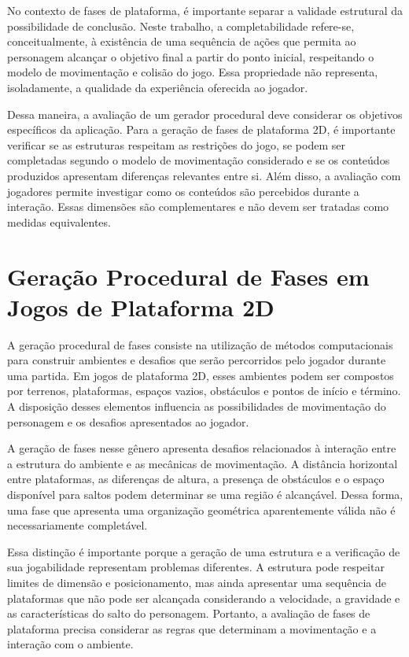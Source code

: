 No contexto de fases de plataforma, é importante
separar a validade estrutural da possibilidade de
conclusão. Neste trabalho, a completabilidade refere-se,
conceitualmente, à existência de uma sequência de ações
que permita ao personagem alcançar o objetivo final
a partir do ponto inicial, respeitando o modelo de
movimentação e colisão do jogo. Essa propriedade não
representa, isoladamente, a qualidade da experiência
oferecida ao jogador.

Dessa maneira, a avaliação de um gerador procedural
deve considerar os objetivos específicos da aplicação.
Para a geração de fases de plataforma 2D, é importante
verificar se as estruturas respeitam as restrições
do jogo, se podem ser completadas
segundo o modelo de movimentação considerado e se
os conteúdos produzidos apresentam diferenças
relevantes entre si. Além disso, a avaliação com jogadores
permite investigar como os conteúdos são percebidos
durante a interação. Essas dimensões são complementares
e não devem ser tratadas como medidas equivalentes.

\section{Geração Procedural de Fases em Jogos de Plataforma 2D}
\label{sec:geracao-fases}

A geração procedural de fases consiste na utilização de
métodos computacionais para construir ambientes e desafios
que serão percorridos pelo jogador durante uma partida.
Em jogos de plataforma 2D, esses ambientes podem ser
compostos por terrenos, plataformas, espaços vazios,
obstáculos e pontos de início e término. A disposição
desses elementos influencia as possibilidades de
movimentação do personagem e os desafios apresentados
ao jogador.

A geração de fases nesse gênero apresenta desafios
relacionados à interação entre a estrutura do ambiente
e as mecânicas de movimentação. A distância horizontal
entre plataformas, as diferenças de altura, a presença
de obstáculos e o espaço disponível para saltos podem
determinar se uma região é alcançável. Dessa forma,
uma fase que apresenta uma organização geométrica
aparentemente válida não é necessariamente completável.

Essa distinção é importante porque a geração de uma
estrutura e a verificação de sua jogabilidade representam
problemas diferentes. A estrutura pode respeitar limites
de dimensão e posicionamento, mas ainda apresentar
uma sequência de plataformas que não pode ser alcançada
considerando a velocidade, a gravidade e as características
do salto do personagem. Portanto, a avaliação de fases
de plataforma precisa considerar as regras que determinam
a movimentação e a interação com o ambiente.


